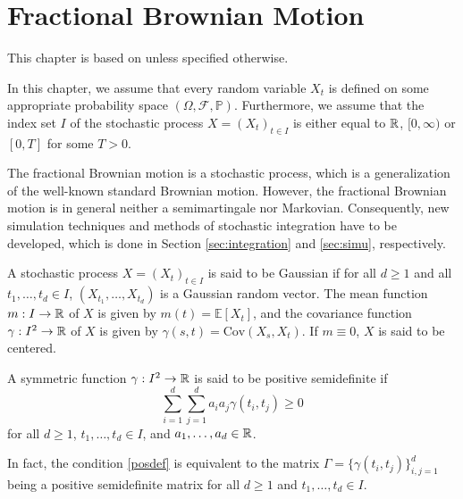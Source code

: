 \chapter{Fractional Brownian Motion}
This chapter is based on \cite{fBMbook} unless specified otherwise.

In this chapter, we assume that every random variable $X_{t}$ is defined on some appropriate probability space $(\Omega, \mathcal{F},\mathbb{P})$. Furthermore, we assume that the index set $I$ of the stochastic process $X=(X_{t})_{t\in I}$ is either equal to $\mathbb{R}$, $[0,\infty)$ or $[0,T]$ for some $T>0$. 

The fractional Brownian motion is a stochastic process, which is a generalization of the well-known standard Brownian motion. However, the fractional Brownian motion is in general neither a semimartingale nor Markovian. Consequently, new simulation techniques and methods of stochastic integration have to be developed, which is done in Section \ref{sec:integration} and \ref{sec:simu}, respectively.
\begin{defn}
    A stochastic process $X=(X_{t})_{t\in I}$ is said to be Gaussian if for all $d\geq 1$ and all $t_{1},\dots,t_{d}\in I$, $(X_{t_{1}},\dots,X_{t_{d}})$ is a Gaussian random vector. The mean function $m: I\to \mathbb{R}$ of $X$ is given by $m(t)=\mathbb{E}[X_{t}]$, and the covariance function $\gamma: I^{2}\to\mathbb{R}$ of $X$ is given by $\gamma(s,t)=\textrm{Cov}(X_{s},X_{t})$. If $m\equiv 0$, $X $ is said to be centered.
\end{defn}

\begin{defn}
    A symmetric function $\gamma: I^{2}\to \mathbb{R}$ is said to be positive semidefinite if
    \begin{equation}\label{posdef}
        \sum_{i=1}^{d}\sum_{j=1}^{d}a_{i}a_{j}\gamma(t_{i},t_{j})\geq 0
    \end{equation}
    for all $d\geq 1$, $t_{1},\dots,t_{d}\in I$, and $a_{1},\dots,a_{d}\in\mathbb{R}$.
\end{defn}
In fact, the condition \eqref{posdef} is equivalent to the matrix $\Gamma=\big\{\gamma (t_{i},t_{j})\big\}_{i,j=1}^{d}$ being a positive semidefinite matrix for all $d\geq 1$ and $t_{1},\dots,t_{d}\in I$.

